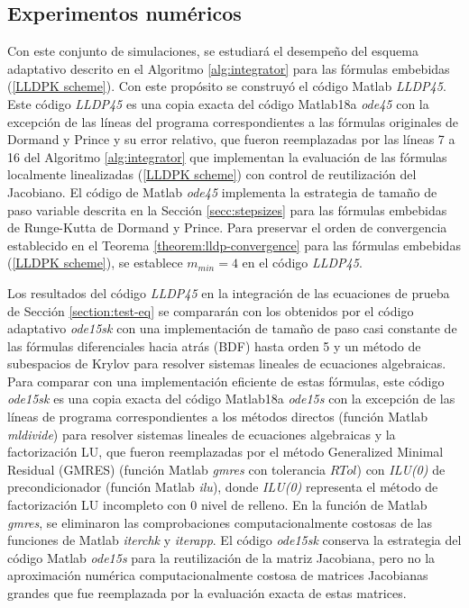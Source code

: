 \subsection{Experimentos numéricos}\label{section:num-exp-lldp-var-step}
Con este conjunto de simulaciones, se estudiará el desempeño del esquema adaptativo descrito en el Algoritmo \ref{alg:integrator} para las fórmulas embebidas (\ref{LLDPK scheme}). Con este propósito se construyó el código Matlab \emph{LLDP45}. Este código \emph{LLDP45} es una copia exacta del código Matlab18a \emph{ode45} \cite{shampine1997matlab} con la excepción de las líneas del programa correspondientes a las fórmulas originales de Dormand y Prince y su error relativo, que fueron reemplazadas por las líneas 7 a 16 del Algoritmo \ref{alg:integrator} que implementan la evaluación de las fórmulas localmente linealizadas (\ref{LLDPK scheme}) con control de reutilización del Jacobiano. El código de Matlab \emph{ode45} implementa la estrategia de tamaño de paso variable descrita en la Sección \ref{secc:stepsizes} para las fórmulas embebidas de Runge-Kutta de Dormand y Prince. Para preservar el orden de convergencia establecido en el Teorema \ref{theorem:lldp-convergence} para las fórmulas embebidas (\ref{LLDPK scheme}), se establece $m_{min}=4$ en el código \emph{LLDP45}.

Los resultados del código \emph{LLDP45} en la integración de las ecuaciones de prueba de Sección \ref{section:test-eq} se compararán con los obtenidos por el código adaptativo \emph{ode15sk} con una implementación de tamaño de paso casi constante de las fórmulas diferenciales hacia atrás (BDF) hasta orden 5 y un método de subespacios de Krylov para resolver sistemas lineales de ecuaciones algebraicas. Para comparar con una implementación eficiente de estas fórmulas, este código \emph{ode15sk} es una copia exacta del código Matlab18a \emph{ode15s} \cite{shampine1997matlab} con la excepción de las líneas de programa correspondientes a los métodos directos (función Matlab \emph{mldivide}) para resolver sistemas lineales de ecuaciones algebraicas y la factorización LU, que fueron reemplazadas por el método Generalized Minimal Residual (GMRES) (función Matlab \emph{gmres} con tolerancia $RTol$) con \emph{ILU(0)} de precondicionador (función Matlab \emph{ilu}), donde \emph{ILU(0)} representa el método de factorización LU incompleto con 0 nivel de relleno. En la función de Matlab \emph{gmres}, se eliminaron las comprobaciones computacionalmente costosas de las funciones de Matlab \emph{iterchk} y \emph{iterapp}. El código \emph{ode15sk} conserva la estrategia del código Matlab \emph{ode15s} para la reutilización de la matriz Jacobiana, pero no la aproximación numérica computacionalmente costosa de matrices Jacobianas grandes que fue reemplazada por la evaluación exacta de estas matrices.

